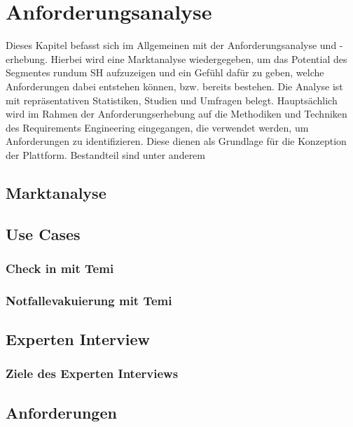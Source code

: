 \chapter{Anforderungsanalyse}
\label{chap:anforderungsanalyse}
    Dieses Kapitel befasst sich im Allgemeinen mit der Anforderungsanalyse und -erhebung. Hierbei wird eine
    Marktanalyse wiedergegeben, um das Potential des Segmentes rundum \acl{SH} aufzuzeigen und ein Gefühl 
    dafür zu geben, welche Anforderungen dabei entstehen können, bzw. bereits bestehen. Die Analyse ist 
    mit repräsentativen Statistiken, Studien und Umfragen belegt. Hauptsächlich wird im Rahmen der Anforderungserhebung 
    auf die Methodiken und Techniken des Requirements Engineering eingegangen, die verwendet werden, um 
    Anforderungen zu identifizieren. Diese dienen als Grundlage für die Konzeption der Plattform. Bestandteil 
    sind unter anderem %
\section{Marktanalyse}
\label{sec:marktanalyse}
\section{Use Cases}
\subsection{Check in mit Temi}
\subsection{Notfallevakuierung mit Temi}
\section{Experten Interview}
\subsection{Ziele des Experten Interviews}
\section{Anforderungen}
